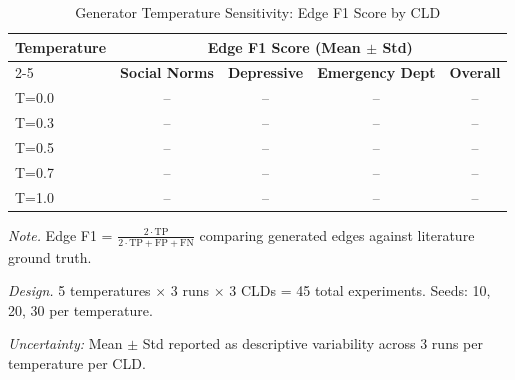 \begin{table}[H]
\centering
\caption{Generator Temperature Sensitivity: Edge F1 Score by CLD}
\label{tab:temperature_sensitivity}
\begin{threeparttable}
\begin{tabular}{lcccc}
\toprule
\textbf{Temperature} & \multicolumn{4}{c}{\textbf{Edge F1 Score (Mean $\pm$ Std)}} \\
\cmidrule(lr){2-5}
 & \textbf{Social Norms} & \textbf{Depressive} & \textbf{Emergency Dept} & \textbf{Overall} \\
\midrule
T=0.0 & -- & -- & -- & -- \\
T=0.3 & -- & -- & -- & -- \\
T=0.5 & -- & -- & -- & -- \\
T=0.7 & -- & -- & -- & -- \\
T=1.0 & -- & -- & -- & -- \\
\bottomrule
\end{tabular}
\begin{tablenotes}
\small
\item \textit{Note.} Edge F1 = $\frac{2 \cdot \text{TP}}{2 \cdot \text{TP} + \text{FP} + \text{FN}}$ comparing generated edges against literature ground truth.
\item \textit{Design.} 5 temperatures $\times$ 3 runs $\times$ 3 CLDs = 45 total experiments. Seeds: 10, 20, 30 per temperature.
\item \textit{Uncertainty:} Mean $\pm$ Std reported as descriptive variability across 3 runs per temperature per CLD.
\end{tablenotes}
\end{threeparttable}
\end{table}